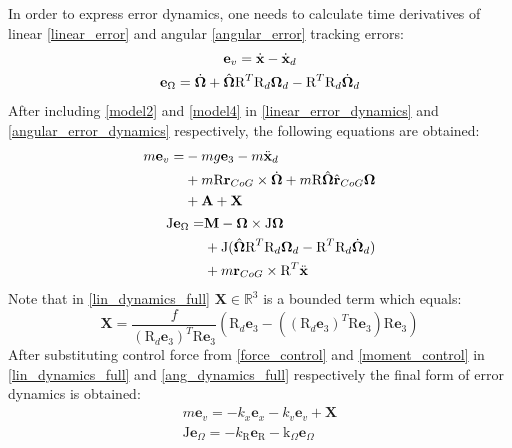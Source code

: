 In order to express error dynamics, one needs to calculate time derivatives of linear \ref{linear_error} and angular \ref{angular_error} tracking errors:
\begin{gather}
	\textbf{e}_v = \dot{\textbf{x}} - \dot{\textbf{x}}_d \label{linear_error_dynamics}\\
	\textbf{e}_\Omega = \dot{\boldsymbol{\Omega}} + \hat{\boldsymbol{\Omega}}\text{R}^T\text{R}_d\boldsymbol{\Omega}_d - \text{R}^T\text{R}_d\dot{\boldsymbol{\Omega}}_d \label{angular_error_dynamics}
\end{gather}
After including \ref{model2} and \ref{model4} in \ref{linear_error_dynamics} and \ref{angular_error_dynamics} respectively, the following equations are obtained:
\begin{align}
	\label{lin_dynamics_full}
	\begin{split}
		m\textbf{e}_v = & - mg\textbf{e}_3 - m\ddot{\textbf{x}}_d \\
			&+ m\text{R}\textbf{r}_{CoG}  \times \dot{\boldsymbol{\Omega}} + m\text{R}\hat{\boldsymbol{\Omega}}\hat{\textbf{r}}_{CoG}\boldsymbol{\Omega} \\
			&+ \textbf{A} + \textbf{X}	
	\end{split} \\
	\label{ang_dynamics_full}
	\begin{split}
		\text{J}\textbf{e}_\Omega = &\textbf{M} - \boldsymbol{\Omega} \times \text{J}\boldsymbol{\Omega} \\
			&+ \text{J}(\hat{\boldsymbol{\Omega}}\text{R}^T\text{R}_d\boldsymbol{\Omega}_d - \text{R}^T\text{R}_d\dot{\boldsymbol{\Omega}}_d) \\
			&+ m\textbf{r}_{CoG} \times \text{R}^T \ddot{\textbf{x}}
	\end{split}
\end{align}
Note that in \ref{lin_dynamics_full} $\textbf{X}\in\mathbb{\text{R}}^3$ is a bounded term which equals:
\begin{equation}
	\textbf{X} = \frac{f}{(\text{R}_d\textbf{e}_3)^T\text{R}\textbf{e}_3}(\text{R}_d \textbf{e}_3 - ((\text{R}_d\textbf{e}_3)^T\text{R}\textbf{e}_3)\text{R}\textbf{e}_3)
\end{equation}
After substituting control force from \ref{force_control} and \ref{moment_control} in \ref{lin_dynamics_full} and \ref{ang_dynamics_full} respectively the final form of error dynamics is obtained:
\begin{gather}
	m\textbf{e}_v = -k_x \textbf{e}_x - k_v \textbf{e}_v + \textbf{X} \label{error_dynamics_linear}\\ 
	\text{J}\textbf{e}_\Omega = -k_\text{R} \textbf{e}_\text{R} - \text{k}_\Omega \textbf{e}_\Omega \label{error_dynamics_angular}
\end{gather}

